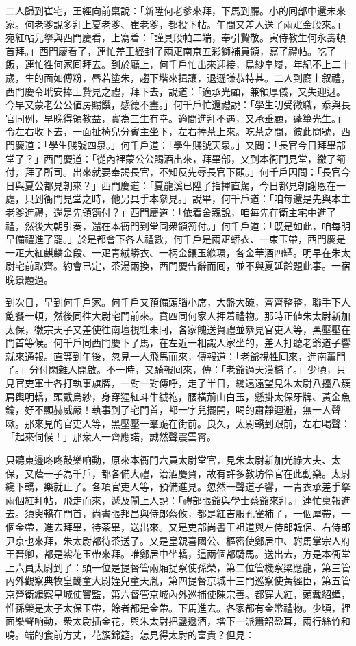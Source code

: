 二人歸到崔宅，王經向前稟說：「新陞何老爹來拜，下馬到廳。小的囘部中還未來家。何老爹說多拜上夏老爹、崔老爹，都投下帖。午間又差人送了兩疋金段來。」宛紅帖兒拏與西門慶看，上寫着：「謹具段帕二端，奉引贄敬。寅侍教生何永壽頓首拜。」西門慶看了，連忙差王經封了兩疋南京五彩獅補員領，寫了禮帖。吃了飯，連忙徃何家囘拜去。到於廳上，何千戶忙出來迎接，烏紗皁履，年紀不上二十歲，生的面如傅粉，唇若塗朱，趨下堦來揖讓，退遜謙恭特甚。二人到廳上叙禮，西門慶令玳安捧上贄見之禮，拜下去，說道：「適承光顧，兼領厚儀，又失迎迓。今早又蒙老公公値房賜饌，感德不盡。」何千戶忙還禮說：「學生叨受微職，忝與長官同例，早晚得領教益，實為三生有幸。適間進拜不遇，又承垂顧，蓬篳光生。」令左右收下去，一面扯椅兒分賓主坐下，左右捧茶上來。吃茶之間，彼此問號，西門慶道：「學生賤號四泉。」何千戶道：「學生賤號天泉。」又問：「長官今日拜畢部堂了？」西門慶道：「從內裡蒙公公賜酒出來，拜畢部，又到本衙門見堂，繳了箚付，拜了所司。出來就要奉謁長官，不知反先辱長官下顧。」何千戶因問：「長官今日與夏公都見朝來？」西門慶道：「夏龍溪已陞了指揮直駕，今日都見朝謝恩在一處，只到衙門見堂之時，他另具手本叅見。」說畢，何千戶道：「咱每還是先與本主老爹進禮，還是先領箚付？」西門慶道：「依着舍親說，咱每先在衛主宅中進了禮，然後大朝引奏，還在本衙門到堂同衆領箚付。」何千戶道：「既是如此，咱每明早備禮進了罷。」於是都會下各人禮數，何千戶是兩疋蟒衣、一束玉帶，西門慶是一疋大紅麒麟金段、一疋青絨蟒衣、一柄金鑲玉縧環，各金華酒四罈。明早在朱太尉宅前取齊。約會已定，茶湯兩換，西門慶告辭而囘，並不與夏延齡題此事。一宿晚景題過。

到次日，早到何千戶家。何千戶又預備頭腦小席，大盤大碗，齊齊整整，聯手下人飽餐一頓，然後同徃大尉宅門前來。賁四同何家人押着禮物。那時正値朱太尉新加太保，徽宗天子又差使徃南壇視牲未囘，各家餽送賀禮並叅見官吏人等，黑壓壓在門首等候。何千戶同西門慶下了馬，在左近一相識人家坐的，差人打聽老爺道子響就來通報。直等到午後，忽見一人飛馬而來，傳報道：「老爺視牲囘來，進南薰門了。」分付閑雜人開啟。不一時，又騎報囘來，傳：「老爺過天漢橋了。」少頃，只見官吏軍士各打執事旗牌，一對一對傳呼，走了半日，纔遠遠望見朱太尉八擡八簇肩輿明轎，頭戴烏紗，身穿猩紅斗牛絨袍，腰橫荊山白玉，懸掛太保牙牌、黃金魚鑰，好不顯赫威嚴！執事到了宅門首，都一字兒擺開，喝的肅靜迴避，無一人聲嗽。那來見的官吏人等，黑壓壓一羣跪在街前。良久，太尉轎到跟前，左右喝聲：「起來伺候！」那衆人一齊應諾，誠然聲震雲霄。

只聽東邊咚咚鼓樂响動，原來本衙門六員太尉堂官，見朱太尉新加光祿大夫、太保，又蔭一子為千戶，都各備大禮，治酒慶賀，故有許多教坊伶官在此動樂。太尉纔下轎，樂就止了。各項官吏人等，預備進見。忽然一聲道子響，一青衣承差手拏兩個紅拜帖，飛走而來，遞及閘上人說：「禮部張爺與學士蔡爺來拜。」連忙稟報進去。須臾轎在門首，尚書張邦昌與侍郎蔡攸，都是紅吉服孔雀補子，一個犀帶，一個金帶，進去拜畢，待茶畢，送出來。又是吏部尚書王祖道與左侍郎韓侶、右侍郎尹京也來拜，朱太尉都待茶送了。又是皇親喜國公、樞密使鄭居中、駙馬掌宗人府王晉卿，都是紫花玉帶來拜。唯鄭居中坐轎，這兩個都騎馬。送出去，方是本衙堂上六員太尉到了：頭一位是提督管兩廂捉察使孫榮，第二位管機察梁應龍，第三管內外觀察典牧皇畿童大尉姪兒童天胤，第四提督京城十三門巡察使黃經臣，第五管京營衛緝察皇城使竇監，第六督管京城內外巡捕使陳宗善。都穿大紅，頭戴貂蟬，惟孫榮是太子太保玉帶，餘者都是金帶。下馬進去。各家都有金幣禮物。{}少頃，裡面樂聲响動，衆太尉插金花，與朱太尉把盞遞酒，堦下一派簫韶盈耳，兩行絲竹和鳴。端的食前方丈，花簇錦筵。怎見得太尉的富貴？但見：

